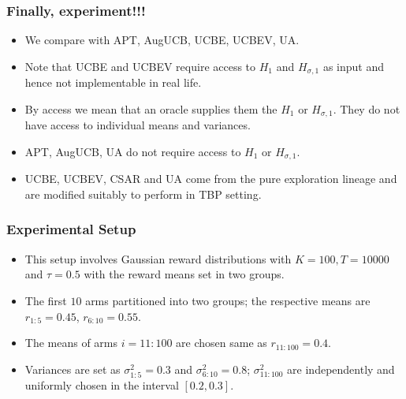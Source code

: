 %    


\begin{frame}
\frametitle{Finally, experiment!!!}
\begin{itemize}
\item<1-> We compare with APT, AugUCB, UCBE, UCBEV, UA.
\item<2-> Note that UCBE and UCBEV require access to $H_1$ and $H_{\sigma, 1}$ as input and hence not implementable in real life. 
\item<2-> By access we mean that an oracle supplies them the $H_1$ or $H_{\sigma, 1}$. They do not have access to individual means and variances.
\item<3-> APT, AugUCB, UA do not require access to $H_1$ or $H_{\sigma, 1}$.
\item<4-> UCBE, UCBEV, CSAR and UA come from the pure exploration lineage and are modified suitably to perform in TBP setting.
\end{itemize}
\end{frame}

\begin{frame}
\frametitle{Experimental Setup}
\begin{itemize}
\item<1-> This setup involves Gaussian reward distributions with $K=100, T=10000$ and $\tau=0.5$ with the reward means set in two groups.
\item<2-> The first $10$ arms partitioned into two groups; the respective means are $r_{1:5}=0.45$, $r_{6:10}=0.55$.
\item<3-> The means of arms $i=11:100$ are chosen same as $r_{11:100}=0.4$.
\item<3-> Variances are set as $\sigma_{1:5}^{2}=0.3$ and $\sigma_{6:10}^{2}=0.8$;  $\sigma_{11:100}^{2}$ are independently and uniformly chosen in the interval $[0.2,0.3]$. 
\end{itemize}
\end{frame}



